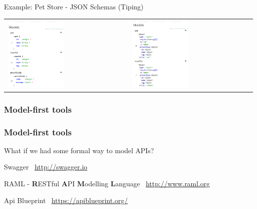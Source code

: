 \begin{frame}[allowframebreaks]
	\begin{exampleblock}{Example: Pet Store - JSON Schemas (Tiping)}
		\begin{tabularx}{\textwidth}{X||X}
			\includegraphics[width=0.48\textwidth]{./img/api_example_schemas1_alpha.png} &
			\includegraphics[width=0.48\textwidth]{./img/api_example_schemas2_alpha.png}
		\end{tabularx}
	\end{exampleblock}
	
\end{frame}

\subsubsection{Model-first tools}

\begin{frame} %
	\frametitle{Model-first tools}
	
	What if we had some formal way to model APIs?
	
	\begin{exampleblock}{Swagger}
		 \swaggerlogo\ \url{http://swagger.io}
	\end{exampleblock}
	
	\begin{exampleblock}{RAML - \textbf{R}ESTful \textbf{A}PI \textbf{M}odelling \textbf{L}anguage}	
		\ramllogo\ \url{http://www.raml.org}
	\end{exampleblock}
	
	\begin{exampleblock}{Api Blueprint}
	 	\blueprintlogo\ \url{https://apiblueprint.org/}
	\end{exampleblock}
\end{frame}

